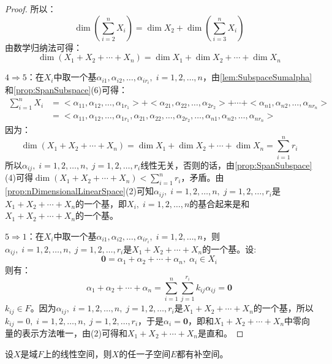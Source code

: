 \begin{proof}
	所以：
	\begin{equation*}
		\dim\left(\sum_{i=2}^{n}X_i\right)
		=\dim X_2+\dim\left(\sum_{i=3}^{n}X_i\right)
	\end{equation*}
	由数学归纳法可得：
	\begin{equation*}
		\dim(X_1+X_2+\cdots+X_n)=\dim X_1+\dim X_2+\cdots+\dim X_n
	\end{equation*}\par
	$4\Rightarrow5$：在$X_i$中取一个基$\alpha_{i1},\alpha_{i2},\dots,\alpha_{ir_i},\;i=1,2,\dots,n$，由\cref{lem:SubspaceSumalpha}和\cref{prop:SpanSubspace}(6)可得：
	\begin{align*}
		\sum_{i=1}^{n}X_i
		&=<\alpha_{11},\alpha_{12},\dots,\alpha_{1r_1}>+<\alpha_{21},\alpha_{22},\dots,\alpha_{2r_2}>+\cdots+<\alpha_{n1},\alpha_{n2},\dots,\alpha_{nr_n}> \\
		&=<\alpha_{11},\alpha_{12},\dots,\alpha_{1r_1},\alpha_{21},\alpha_{22},\dots,\alpha_{2r_2},\dots,\alpha_{n1},\alpha_{n2},\dots,\alpha_{nr_n}>
	\end{align*}
	因为：
	\begin{equation*}
		\dim(X_1+X_2+\cdots+X_n)=\dim X_1+\dim X_2+\cdots+\dim X_n=\sum_{i=1}^{n}r_i
	\end{equation*}
	所以$\alpha_{ij},\;i=1,2,\dots,n,\;j=1,2,\dots,r_i$线性无关，否则的话，由\cref{prop:SpanSubspace}(4)可得$\dim(X_1+X_2+\cdots+X_n)<\sum\limits_{i=1}^{n}r_i$，矛盾。由\cref{prop:nDimensionalLinearSpace}(2)可知$\alpha_{ij},\;i=1,2,\dots,n,\;j=1,2,\dots,r_i$是$X_1+X_2+\cdots+X_n$的一个基，即$X_i,\;i=1,2,\dots,n$的基合起来是和$X_1+X_2+\cdots+X_n$的一个基。\par
	$5\Rightarrow1$：在$X_i$中取一个基$\alpha_{i1},\alpha_{i2},\dots,\alpha_{ir_i},\;i=1,2,\dots,n$，则$\alpha_{ij},\;i=1,2,\dots,n,\;j=1,2,\dots,r_i$是$X_1+X_2+\cdots+X_n$的一个基。设:
	\begin{equation*}
		\mathbf{0}=\alpha_1+\alpha_2+\cdots+\alpha_n,\;\alpha_i\in X_i
	\end{equation*}
	则有：
	\begin{equation*}
		\alpha_1+\alpha_2+\cdots+\alpha_n=\sum_{i=1}^{n}\sum_{j=1}^{r_i}k_{ij}\alpha_{ij}=\mathbf{0}
	\end{equation*}
	$k_{ij}\in F$。因为$\alpha_{ij},\;i=1,2,\dots,n,\;j=1,2,\dots,r_i$是$X_1+X_2+\cdots+X_n$的一个基，所以$k_{ij}=0,\;i=1,2,\dots,n,\;j=1,2,\dots,r_i$，于是$\alpha_i=\mathbf{0}$，即和$X_1+X_2+\cdots+X_n$中零向量的表示方法唯一，由(2)可得和$X_1+X_2+\cdots+X_n$是直和。
\end{proof}
\begin{theorem}\label{theo:ExistenceOfComplement}
	设$X$是域$F$上的线性空间，则$X$的任一子空间$E$都有补空间。
\end{theorem}
